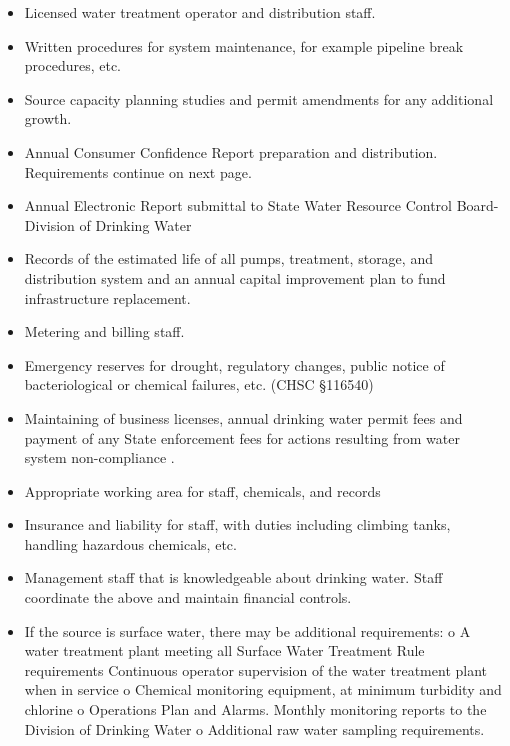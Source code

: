 \begin{itemize}
\item  Licensed water treatment operator and distribution staff.\\
\item  Written procedures for system maintenance, for example pipeline break procedures, etc.\\
\item  Source capacity planning studies and permit amendments for any additional growth.\\
\item  Annual Consumer Confidence Report preparation and distribution. Requirements continue on next page.\\
\item  Annual Electronic Report submittal to State Water Resource Control Board-Division of Drinking Water \\
\item  Records of the estimated life of all pumps, treatment, storage, and distribution system and an annual capital improvement plan to fund infrastructure replacement.\\
\item  Metering and billing staff.\\
\item  Emergency reserves for drought, regulatory changes, public notice of bacteriological or chemical failures, etc. (CHSC §116540) \\
\item  Maintaining of business licenses, annual drinking water permit fees and payment of any State enforcement fees for actions resulting from water system non-compliance .\\
\item  Appropriate working area for staff, chemicals, and records \\
\item  Insurance and liability for staff, with duties including climbing tanks, handling hazardous chemicals, etc. \\
\item  Management staff that is knowledgeable about drinking water. Staff coordinate the above and maintain financial controls.\\
\item  If the source is surface water, there may be additional requirements: o A water treatment plant meeting all Surface Water Treatment Rule requirements  Continuous operator supervision of the water treatment plant when in service o Chemical monitoring equipment, at minimum turbidity and chlorine  o Operations Plan and Alarms. Monthly monitoring reports to the Division of Drinking Water o Additional raw water sampling requirements.



\end{itemize}

